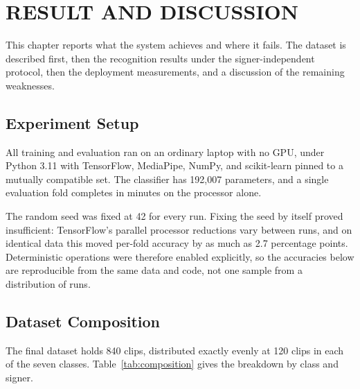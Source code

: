 \chapter{RESULT AND DISCUSSION}
\label{ch:results}

This chapter reports what the system achieves and where it fails. The dataset is described first, then the recognition results under the signer-independent protocol, then the deployment measurements, and a discussion of the remaining weaknesses.

\section{Experiment Setup}
\label{sec:experimentsetup}

All training and evaluation ran on an ordinary laptop with no GPU, under Python 3.11 with TensorFlow, MediaPipe, NumPy, and scikit-learn pinned to a mutually compatible set. The classifier has 192{,}007 parameters, and a single evaluation fold completes in minutes on the processor alone.

The random seed was fixed at 42 for every run. Fixing the seed by itself proved insufficient: TensorFlow's parallel processor reductions vary between runs, and on identical data this moved per-fold accuracy by as much as 2.7 percentage points. Deterministic operations were therefore enabled explicitly, so the accuracies below are reproducible from the same data and code, not one sample from a distribution of runs.

\section{Dataset Composition}
\label{sec:datasetcomposition}

The final dataset holds 840 clips, distributed exactly evenly at 120 clips in each of the seven classes. Table~\ref{tab:composition} gives the breakdown by class and signer.

